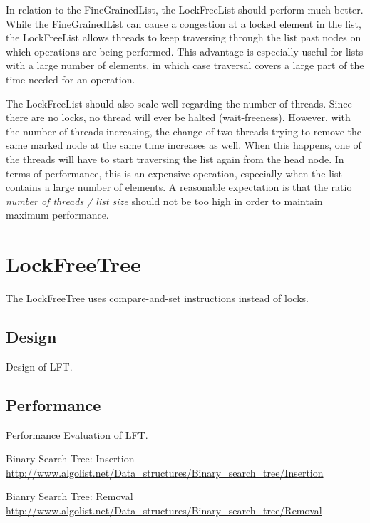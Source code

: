 \documentclass[a4paper]{article}
\begin{document}
In relation to the FineGrainedList, the LockFreeList should perform much better.
While the FineGrainedList can cause a congestion at a locked element in the list,
the LockFreeList allows threads to keep traversing through the list past nodes on
which operations are being performed. This advantage is especially useful for lists
with a large number of elements, in which case traversal covers a large part of the
time needed for an operation.

The LockFreeList should also scale well regarding the number of threads. Since there
are no locks, no thread will ever be halted (wait-freeness). However, with the number
of threads increasing, the change of two threads trying to remove the same marked node
at the same time increases as well. When this happens, one of the threads will have to
start traversing the list again from the head node. In terms of performance, this is an
expensive operation, especially when the list contains a large number of elements. A
reasonable expectation is that the ratio \emph{number of threads / list size} should
not be too high in order to maintain maximum performance.

\section{LockFreeTree}

The LockFreeTree uses compare-and-set instructions instead of locks.

\subsection{Design}

Design of LFT.

\subsection{Performance}

Performance Evaluation of LFT.

\begin{thebibliography}{9}

    Binary Search Tree: Insertion
    \url{http://www.algolist.net/Data_structures/Binary_search_tree/Insertion}
    
    Bianry Search Tree: Removal
    \url{http://www.algolist.net/Data_structures/Binary_search_tree/Removal}
  
\end{thebibliography}
\end{document}
